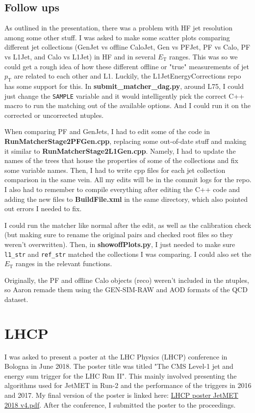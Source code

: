 \subsection{Follow ups}

As outlined in the presentation, there was a problem with HF jet resolution among some other stuff. I was asked to make some scatter plots comparing different jet collections (GenJet vs offline CaloJet, Gen vs PFJet, PF vs Calo, PF vs L1Jet, and Calo vs L1Jet) in HF and in several $E_{\mathrm{T}}$ ranges. This was so we could get a rough idea of how these different offline or "true" measurements of jet $p_{\mathrm{T}}$ are related to each other and L1. Luckily, the L1JetEnergyCorrections repo has some support for this. In \textbf{submit\_matcher\_dag.py}, around L75, I could just change the \texttt{SAMPLE} variable and it would intelligently pick the correct C++ macro to run the matching out of the available options. And I could run it on the corrected or uncorrected ntuples.

When comparing PF and GenJets, I had to edit some of the code in \textbf{RunMatcherStage2PFGen.cpp}, replacing some out-of-date stuff and making it similar to \textbf{RunMatcherStage2L1Gen.cpp}. Namely, I had to update the names of the trees that house the properties of some of the collections and fix some variable names. Then, I had to write cpp files for each jet collection comparison in the same vein. All my edits will be in the commit logs for the repo. I also had to remember to compile everything after editing the C++ code and adding the new files to \textbf{BuildFile.xml} in the same directory, which also pointed out errors I needed to fix.

I could run the matcher like normal after the edit, as well as the calibration check (but making sure to rename the original pairs and checked root files so they weren't overwritten). Then, in \textbf{showoffPlots.py}, I just needed to make sure \texttt{l1\_str} and \texttt{ref\_str} matched the collections I was comparing. I could also set the $E_{\mathrm{T}}$ ranges in the relevant functions.

Originally, the PF and offline Calo objects (reco) weren't included in the ntuples, so Aaron remade them using the GEN-SIM-RAW and AOD formats of the QCD dataset.

\section{LHCP}

I was asked to present a poster at the LHC Physics (LHCP) conference in Bologna in June 2018. The poster title was titled "The CMS Level-1 jet and energy sum trigger for the LHC Run II". This mainly involved presenting the algorithms used for JetMET in Run-2 and the performance of the triggers in 2016 and 2017. My final version of the poster is linked here: \href{run:./sec20/LHCP poster JetMET 2018 v4.pdf}{LHCP poster JetMET 2018 v4.pdf}. After the conference, I submitted the poster to the proceedings.
